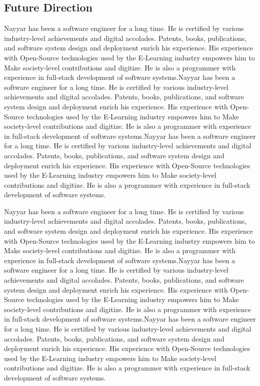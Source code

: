 \documentclass[a4paper,12pt]{report}
\newenvironment{pageborder}{
  \begin{tcolorbox}[width=\textwidth, height=\textheight, colframe=black, colback=white, sharp corners, boxrule=0.5mm, nobeforeafter]
}{
  \end{tcolorbox}
}
\begin{document}
\newpage
\begin{pageborder}
  \chapter{Future Direction}
  \lipsum[13]  %
\end{pageborder}
\begin{pageborder}
    Nayyar has been a software engineer for a long time. He is certified by various industry-level achievements and digital accolades. Patents, books, publications, and software system design and deployment enrich his experience. His experience with Open-Source technologies used by the E-Learning industry empowers him to Make society-level contributions and digitize. He is also a programmer with experience in full-stack development of software systems.Nayyar has been a software engineer for a long time. He is certified by various industry-level achievements and digital accolades. Patents, books, publications, and software system design and deployment enrich his experience. His experience with Open-Source technologies used by the E-Learning industry empowers him to Make society-level contributions and digitize. He is also a programmer with experience in full-stack development of software systems.Nayyar has been a software engineer for a long time. He is certified by various industry-level achievements and digital accolades. Patents, books, publications, and software system design and deployment enrich his experience. His experience with Open-Source technologies used by the E-Learning industry empowers him to Make society-level contributions and digitize. He is also a programmer with experience in full-stack development of software systems.
\end{pageborder}
\begin{pageborder}
    Nayyar has been a software engineer for a long time. He is certified by various industry-level achievements and digital accolades. Patents, books, publications, and software system design and deployment enrich his experience. His experience with Open-Source technologies used by the E-Learning industry empowers him to Make society-level contributions and digitize. He is also a programmer with experience in full-stack development of software systems.Nayyar has been a software engineer for a long time. He is certified by various industry-level achievements and digital accolades. Patents, books, publications, and software system design and deployment enrich his experience. His experience with Open-Source technologies used by the E-Learning industry empowers him to Make society-level contributions and digitize. He is also a programmer with experience in full-stack development of software systems.Nayyar has been a software engineer for a long time. He is certified by various industry-level achievements and digital accolades. Patents, books, publications, and software system design and deployment enrich his experience. His experience with Open-Source technologies used by the E-Learning industry empowers him to Make society-level contributions and digitize. He is also a programmer with experience in full-stack development of software systems.
\end{pageborder}
\end{document}
